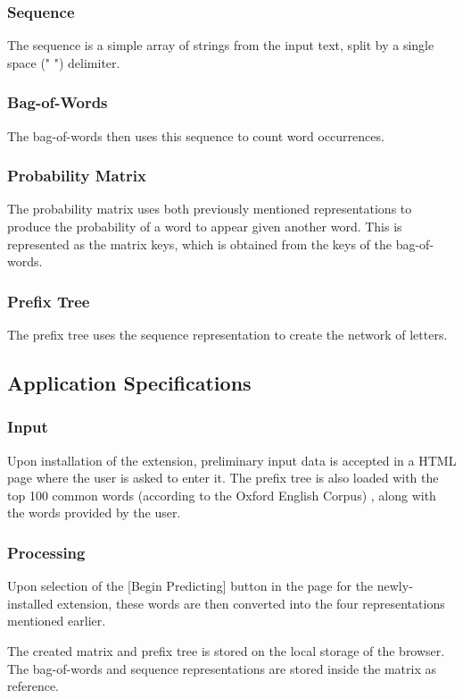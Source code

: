 \documentclass[journal]{./IEEE/IEEEtran}
\begin{document}
\subsubsection{Sequence}
The sequence is a simple array of strings from the input text, split by a single space (" ") delimiter.

\subsubsection{Bag-of-Words}
The bag-of-words then uses this sequence to count word occurrences.

\subsubsection{Probability Matrix}
The probability matrix uses both previously mentioned representations to produce the probability of a word to appear given another word. This is represented as the matrix keys, which is obtained from the keys of the bag-of-words.

\subsubsection{Prefix Tree}
The prefix tree uses the sequence representation to create the network of letters.

\subsection{Application Specifications}
\subsubsection{Input}
Upon installation of the extension, preliminary input data is accepted in a HTML page where the user is asked to enter it. The prefix tree is also loaded with the top 100 common words (according to the Oxford English Corpus) \cite{OxfordFacts}, along with the words provided by the user.

\subsubsection{Processing}
Upon selection of the [Begin Predicting] button in the page for the newly-installed extension, these words are then converted into the four representations mentioned earlier.

The created matrix and prefix tree is stored on the local storage of the browser. The bag-of-words and sequence representations are stored inside the matrix as reference.
\end{document}
